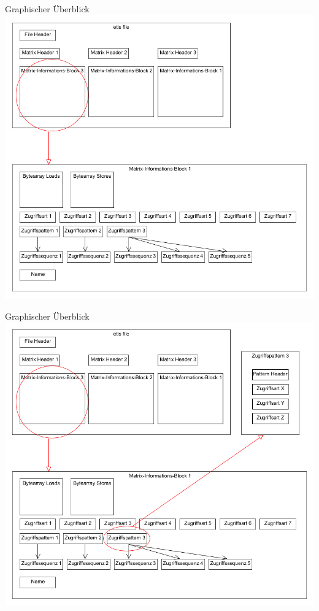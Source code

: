 \begin{frame}{Graphischer Überblick}
 \includegraphics[height=0.95\textheight]{mctracer/dateiaufbau2}
\end{frame}

\begin{frame}{Graphischer Überblick}
 \includegraphics[height=0.95\textheight]{mctracer/dateiaufbau3}
\end{frame}